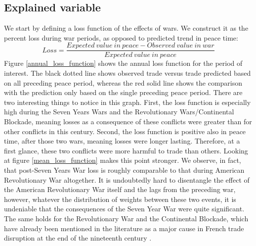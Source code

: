 \documentclass[12pt,a4paper,notitlepage,english]{article}
\begin{document}
\subsection{Explained variable}
We start by defining a loss function of the effects of wars.
We construct it as the percent loss during war periods, as opposed to predicted trend in peace time: 
\begin{equation*}
Loss = \frac{Expected \> value \> in \> peace - Observed \> value \> in \> war }{Expected \> value \> in \> peace}
\end{equation*}
Figure \ref{annual_loss_function} shows the annual loss function for the period of interest.
The black dotted line shows observed trade versus trade predicted based on all preceding peace period, whereas the red solid line shows the comparison with the prediction only based on the single preceding peace period.
There are two interesting things to notice in this graph.
First, the loss function is especially high during the Seven Years Wars and the Revolutionary Wars/Continental Blockade, meaning losses as a consequence of these conflicts were greater than for other conflicts in this century.
Second, the loss function is positive also in peace time, after those two wars, meaning losses were longer lasting.
Therefore, at a first glance, these two conflicts were more harmful to trade than others.
Looking at figure \ref{mean_loss_function} makes this point stronger.
We observe, in fact, that post-Seven Years War loss is roughly comparable to that during American Revolutionary War altogether.
It is undoubtedly hard to disentangle the effect of the American Revolutionary War itself and the lags from the preceding war, however, whatever the distribution of weights between these two events, it is undeniable that the consequences of the Seven Year War were quite significant.
The same holds for the Revolutionary War and the Continental Blockade, which have already been mentioned in the literature as a major cause in French trade disruption at the end of the nineteenth century \citep{o2006worldwide}.
\end{document}

